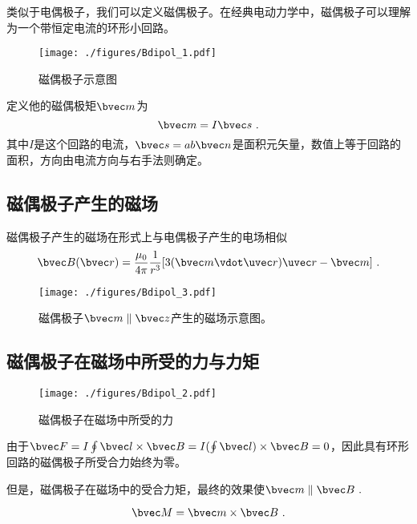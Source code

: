 
\begin{issues}
\issueDraft
\end{issues}
类似于电偶极子，我们可以定义磁偶极子。在经典电动力学中，磁偶极子可以理解为一个带恒定电流的环形小回路。
\begin{figure}[ht]
\centering
\texttt{[image: ./figures/Bdipol\_1.pdf]}
\caption{磁偶极子示意图} \label{Bdipol_fig1}
\end{figure}

定义他的磁偶极矩$\bvec m$为
\begin{equation}
\bvec m = I \bvec s~.
\end{equation}
其中$I$是这个回路的电流，$\bvec s = ab\bvec n$是面积元矢量，数值上等于回路的面积，方向由电流方向与右手法则确定。

\subsection{磁偶极子产生的磁场}
磁偶极子产生的磁场在形式上与电偶极子产生的电场相似
\begin{equation}
\bvec B(\bvec r) = \frac{\mu_0}{4\pi} \frac{1}{r^3} [3(\bvec m \vdot \uvec r) \uvec r - \bvec m]~.
\end{equation}
\begin{figure}[ht]
\centering
\texttt{[image: ./figures/Bdipol\_3.pdf]}
\caption{磁偶极子$\bvec m \parallel \bvec z $产生的磁场示意图。} \label{Bdipol_fig3}
\end{figure}

\subsection{磁偶极子在磁场中所受的力与力矩}
\begin{figure}[ht]
\centering
\texttt{[image: ./figures/Bdipol\_2.pdf]}
\caption{磁偶极子在磁场中所受的力} \label{Bdipol_fig2}
\end{figure}
由于$\bvec F = I \oint \bvec l \times \bvec B = I (\oint \bvec l) \times \bvec B = 0$，因此具有环形回路的磁偶极子所受合力始终为零。

但是，磁偶极子在磁场中的受合力矩，最终的效果使$\bvec m \parallel \bvec B~.$

\begin{equation}
\bvec M = \bvec m \times \bvec B~.
\end{equation}
